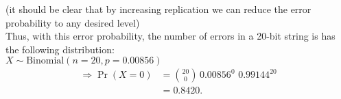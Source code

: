 \documentclass[12pt]{article}
\begin{document}
{\begin{minipage}[t]{0.98\textwidth}
\begin{minipage}[t]{0.47\textwidth}
\begin{enumerate}[a)]
{\footnotesize(it should be clear that by increasing replication we can reduce the error probability to any desired level)}\\[0.4cm]
Thus, with this error probability, the number of errors in a 20-bit string is has the following distribution:\\[0.2cm]
$X \sim \text{Binomial}(n=20,p=0.00856)$
\begin{align*}
\Rightarrow \Pr(X = 0) &= \binom{20}{0}\,0.00856^0\,\,0.99144^{20} \\[0.2cm]
&= 0.8420.
\end{align*}
\end{enumerate}
\end{minipage}
\end{minipage}}\vspace{0.03\textwidth}
\end{document}
